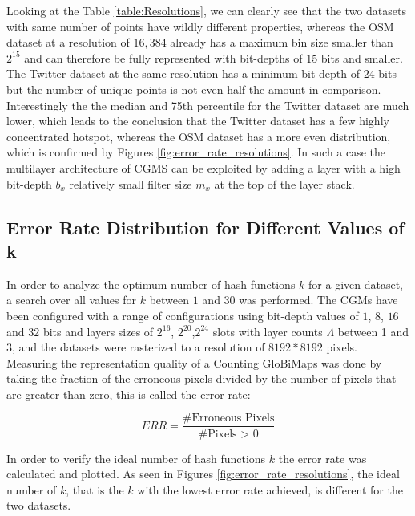 \documentclass[sigconf]{acmart}
\begin{document}
Looking at the Table \ref{table:Resolutions}, we can clearly see that the two datasets with same number of points have wildly different properties, whereas the OSM dataset at a resolution of $16,384$ already has a maximum bin size smaller than $2^{15}$ and can therefore be fully represented with bit-depths of $15$ bits and smaller. The Twitter dataset at the same resolution has a minimum bit-depth of $24$ bits but the number of unique points is not even half the amount in comparison. Interestingly the the median and 75th percentile for the Twitter dataset are much lower, which leads to the conclusion that the Twitter dataset has a few highly concentrated hotspot, whereas the OSM dataset has a more even distribution, which is confirmed by Figures \ref{fig:error_rate_resolutions}. In such a case the multilayer architecture of CGMS can be exploited by adding a layer with a high bit-depth $b_x$ relatively small filter size $m_x$ at the top of the layer stack.


\subsection{Error Rate Distribution for Different Values of k}
\label{error-rate-distribution-for-different-values-of-k}
In order to analyze the optimum number of hash functions $k$ for a given dataset, a search over all values for $k$ between $1$ and $30$ was performed.
The CGMs have been configured with a range of configurations using bit-depth values of $1$, $8$, $16$ and $32$ bits and layers sizes of $2^{16}$, $2^{20}$,$2^{24}$ slots with layer counts $\Lambda$ between 1 and 3, and the datasets were rasterized to a resolution of $8192*8192$ pixels.
Measuring the representation quality of a Counting GloBiMaps was done by taking the fraction of the erroneous pixels divided by the number of pixels that are greater than zero, this is called the error rate:

$$ERR = \frac{\text{\# Erroneous Pixels}}{\text{\# Pixels > 0}}$$

In order to verify the ideal number of hash functions $k$ the error rate was calculated and plotted.
As seen in Figures \ref{fig:error_rate_resolutions}, the ideal number of $k$, that is the $k$ with the lowest error rate achieved, is different for the two datasets.
%
%
\end{document}
